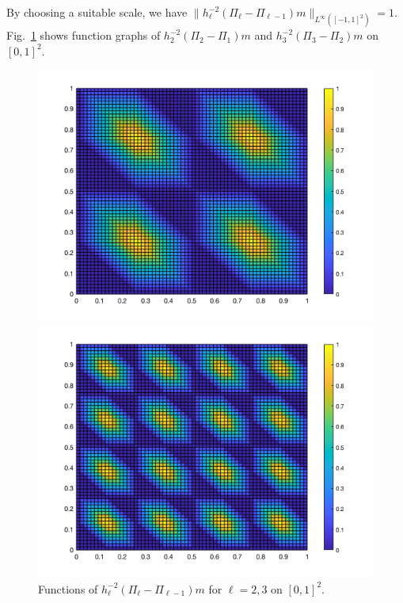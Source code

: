 By choosing a suitable scale, we have $\|h_{\ell}^{-2}(\Pi_\ell- \Pi_{\ell-1})m\|_{L^{\infty}([-1,1]^2)} = 1$. 
Fig.~\ref{fig:T2T3} shows function graphs of $h_2^{-2}(\Pi_2 - \Pi_{1})m$ and $h_{3}^{-2}(\Pi_3- \Pi_{2})m$ on $[0,1]^2$.
\begin{figure}[h!]
	\centering
	\begin{minipage}[t]{0.43\textwidth}
		\centering
		\includegraphics[width=\textwidth]{6DL/figures/4basis}
	\end{minipage}
	\begin{minipage}[t]{0.43\textwidth}
		\centering
		\includegraphics[width=\textwidth]{6DL/figures/16basis}
	\end{minipage}
	\caption{Functions of $h_{\ell}^{-2}(\Pi_\ell- \Pi_{\ell-1})m$ for $\ell = 2,3$ on $[0,1]^2$.}
	\label{fig:T2T3}
\end{figure}

